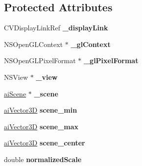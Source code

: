 \subsection*{Protected Attributes}
\begin{DoxyCompactItemize}
\item 
\hypertarget{interface_my_document_ac639f8136a4ab8c776bec1adf6d19241}{C\+V\+Display\+Link\+Ref {\bfseries \+\_\+display\+Link}}\label{interface_my_document_ac639f8136a4ab8c776bec1adf6d19241}

\item 
\hypertarget{interface_my_document_acd77f83a05677a7b2cd103cf5c6a853c}{N\+S\+Open\+G\+L\+Context $\ast$ {\bfseries \+\_\+gl\+Context}}\label{interface_my_document_acd77f83a05677a7b2cd103cf5c6a853c}

\item 
\hypertarget{interface_my_document_a6bb15de15debb003a325644d925b9a47}{N\+S\+Open\+G\+L\+Pixel\+Format $\ast$ {\bfseries \+\_\+gl\+Pixel\+Format}}\label{interface_my_document_a6bb15de15debb003a325644d925b9a47}

\item 
\hypertarget{interface_my_document_a3216f269b1706264da805ce9ecb33715}{N\+S\+View $\ast$ {\bfseries \+\_\+view}}\label{interface_my_document_a3216f269b1706264da805ce9ecb33715}

\item 
\hypertarget{interface_my_document_a13ee296f889813c8f83dca3235c9d5e6}{\hyperlink{structai_scene}{ai\+Scene} $\ast$ {\bfseries \+\_\+scene}}\label{interface_my_document_a13ee296f889813c8f83dca3235c9d5e6}

\item 
\hypertarget{interface_my_document_ab0488501add0c282f99fc247bec5b81b}{\hyperlink{structai_vector3_d}{ai\+Vector3\+D} {\bfseries scene\+\_\+min}}\label{interface_my_document_ab0488501add0c282f99fc247bec5b81b}

\item 
\hypertarget{interface_my_document_a8e791f95260656c76727151c21567056}{\hyperlink{structai_vector3_d}{ai\+Vector3\+D} {\bfseries scene\+\_\+max}}\label{interface_my_document_a8e791f95260656c76727151c21567056}

\item 
\hypertarget{interface_my_document_a70ebbbe8fef05a62b491d84936fd4ca7}{\hyperlink{structai_vector3_d}{ai\+Vector3\+D} {\bfseries scene\+\_\+center}}\label{interface_my_document_a70ebbbe8fef05a62b491d84936fd4ca7}

\item 
\hypertarget{interface_my_document_ac847b792df1f832a631cb29e9511bc6e}{double {\bfseries normalized\+Scale}}\label{interface_my_document_ac847b792df1f832a631cb29e9511bc6e}


\end{DoxyCompactItemize}
